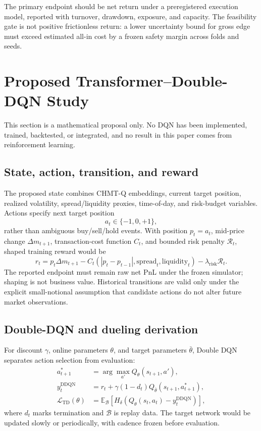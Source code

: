 \documentclass[10pt,letterpaper]{article}
\numberwithin{equation}{section}
\newcommand{\E}{\mathbb{E}}
\theoremstyle{definition}
\theoremstyle{remark}
\begin{document}
The primary endpoint should be net return under a preregistered execution model,
reported with turnover, drawdown, exposure, and capacity. The feasibility gate
is not positive frictionless return: a lower uncertainty bound for gross edge
must exceed estimated all-in cost by a frozen safety margin across folds and
seeds.

\section{Proposed Transformer--Double-DQN Study}

This section is a mathematical proposal only. No DQN has been implemented,
trained, backtested, or integrated, and no result in this paper comes from
reinforcement learning.

\subsection{State, action, transition, and reward}

The proposed state combines CHMT-Q embeddings, current target position,
realized volatility, spread/liquidity proxies, time-of-day, and risk-budget
variables. Actions specify next target position
\begin{equation}
a_t\in\{-1,0,+1\},
\label{eq:actions}
\end{equation}
rather than ambiguous buy/sell/hold events. With position \(p_t=a_t\), mid-price
change \(\Delta m_{t+1}\), transaction-cost function \(C_t\), and bounded risk
penalty \(\mathcal{R}_t\), shaped training reward would be
\begin{equation}
r_t=p_t\Delta m_{t+1}
-C_t(|p_t-p_{t-1}|,\mathrm{spread}_t,\mathrm{liquidity}_t)
-\lambda_{\mathrm{risk}}\mathcal{R}_t.
\label{eq:rl-reward}
\end{equation}
The reported endpoint must remain raw net PnL under the frozen simulator;
shaping is not business value. Historical transitions are valid only under the
explicit small-notional assumption that candidate actions do not alter future
market observations.

\subsection{Double-DQN and dueling derivation}

For discount \(\gamma\), online parameters \(\theta\), and target parameters
\(\bar\theta\), Double DQN separates action selection from evaluation:
\begin{align}
a_{t+1}^{*}&=\arg\max_{a'}Q_\theta(s_{t+1},a'),\nonumber\\
y_t^{\mathrm{DDQN}}&=r_t+\gamma(1-d_t)
Q_{\bar\theta}(s_{t+1},a_{t+1}^{*}),\nonumber\\
\mathcal{L}_{\mathrm{TD}}(\theta)
&=\E_{\mathcal{B}}\!\left[
H_\delta\!\left(Q_\theta(s_t,a_t)-y_t^{\mathrm{DDQN}}\right)
\right],
\label{eq:double-dqn}
\end{align}
where \(d_t\) marks termination and \(\mathcal{B}\) is replay data. The target
network would be updated slowly or periodically, with cadence frozen before
evaluation.
\end{document}
